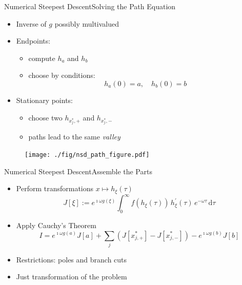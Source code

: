 \documentclass{beamer}
\newcommand{\cemph}[1]{\emph{\color{orange} #1}}
\begin{document}
\begin{frame}{Numerical Steepest Descent}{Solving the Path Equation}
  \begin{minipage}{0.58\linewidth}
    \begin{itemize}
      \item Inverse of $g$ possibly multivalued
      \item Endpoints:
        \begin{itemize}
          \item compute $h_a$ and $h_b$
          \item choose by conditions:
          \begin{equation*}
            h_a(0) = a, \quad h_b(0) = b
          \end{equation*}
        \end{itemize}
      \item Stationary points:
        \begin{itemize}
          \item choose two $h_{x^{*}_j,+}$ and $h_{x^{*}_j,-}$
          \item paths lead to the same \cemph{valley}
        \end{itemize}
    \end{itemize}
  \end{minipage}
  \begin{minipage}{0.40\linewidth}
    \begin{figure}
      \centering
      \texttt{[image: ./fig/nsd\_path\_figure.pdf]}
    \end{figure}
  \end{minipage}
\end{frame}


\begin{frame}{Numerical Steepest Descent}{Assemble the Parts}
  \begin{itemize}
    \item Perform transformations $x \mapsto h_{\xi}(\tau)$
    \begin{equation*}
      J[\xi] :=
      e^{\imath \omega g(\xi)}
      \int_{0}^{\infty}
        f(h_{\xi}(\tau)) \,
        h_{\xi}^{\prime}(\tau) \,
        e^{-\omega \tau} \,
      \mathrm{d}\tau
    \end{equation*}
    \item Apply Cauchy's Theorem
    \begin{equation*}
      I = e^{\imath\omega g(a)} J[a]
        + \sum_{j} \left(J[x_{j,+}^{*}] - J[x_{j,-}^{*}]\right)
        - e^{\imath\omega g(b)} J[b]
    \end{equation*}
    \item Restrictions: poles and branch cuts
    \item Just transformation of the problem
  \end{itemize}
\end{frame}
\end{document}
